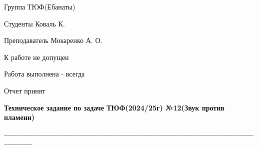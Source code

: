 \documentclass[a4paper,11pt]{article}
\begin{document}
\begin{multicols}{2}
Группа ТЮФ(Ебанаты) 

Студенты Коваль К. 

Преподаватель Мокаренко А. О.

К работе не допущен

Работа выполнена - всегда 

Отчет принят 
\end{multicols}
\renewcommand{\thesection}{\Alph{section}}

\noindent\makebox[\linewidth]{\rule{\textwidth}{2pt}}

\begin{center}
    \textbf{\huge Техническое задание по задаче ТЮФ(2024/25г) №12(Звук против пламени) \normalsize}
    
    \Large\textbf{--------------------------------------------------------------------------------------------------------}
\end{center}
\end{document}
